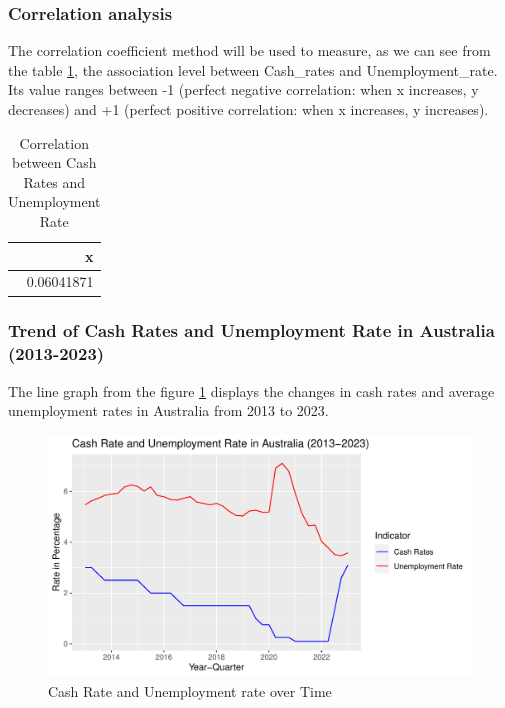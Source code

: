 \documentclass[11pt,a4paper,]{article}
\begin{document}
\hypertarget{correlation-analysis}{%
\subsubsection{Correlation analysis}\label{correlation-analysis}}

The correlation coefficient method will be used to measure, as we can see from the table \ref{tab:corre}, the association level between Cash\_rates and Unemployment\_rate. Its value ranges between -1 (perfect negative correlation: when x increases, y decreases) and +1 (perfect positive correlation: when x increases, y increases).

\begin{table}

\caption{\label{tab:corre}Correlation between Cash Rates and Unemployment Rate}
\centering
\begin{tabular}[t]{r}
\hline
x\\
\hline
0.06041871\\
\hline
\end{tabular}
\end{table}

\hypertarget{trend-of-cash-rates-and-unemployment-rate-in-australia-2013-2023}{%
\subsubsection{Trend of Cash Rates and Unemployment Rate in Australia (2013-2023)}\label{trend-of-cash-rates-and-unemployment-rate-in-australia-2013-2023}}

The line graph from the figure \ref{fig:trend} displays the changes in cash rates and average unemployment rates in Australia from 2013 to 2023.

\begin{figure}[H]
\includegraphics{Inflation_Analysis_files/figure-latex/trend-1} \caption{Cash Rate and Unemployment rate over Time}\label{fig:trend}
\end{figure}
\end{document}
